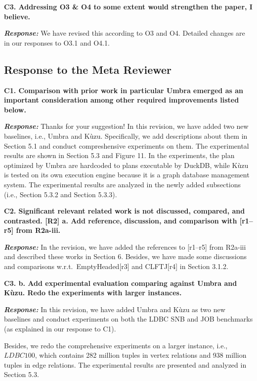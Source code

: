 \textbf{
C3. Addressing O3 \& O4 to some extent would strengthen the paper, I believe.}

\textbf{\textit{Response: }}
We have revised this according to O3 and O4. Detailed changes are in our responses to O3.1 and O4.1.



\subsection{Response to the Meta Reviewer}

\textbf{
C1. Comparison with prior work in particular Umbra emerged as an important consideration among other required improvements listed below.}

\textbf{\textit{Response: }}
Thanks for your suggestion!
In this revision, we have added two new baselines, i.e., Umbra and K\`uzu.
Specifically, we add descriptions about them in Section 5.1 and conduct compreshensive experiments on them.
The experimental results are shown in Section 5.3 and Figure 11.
In the experiments, the plan optimized by Umbra are hardcoded to plans executable by DuckDB, while K\`uzu is tested on its own execution engine because it is a graph database management system.
The experimental results are analyzed in the newly added subsections (i.e., Section 5.3.2 and Section 5.3.3).



\textbf{
C2. Significant relevant related work is not discussed, compared, and contrasted. [R2]
a. Add reference, discussion, and comparison with [r1–r5] from R2a-iii.
}

\textbf{\textit{Response: }}
In the revision, we have added the references to [r1--r5] from R2a-iii and described these works in Section 6.
Besides, we have made some discussions and comparisons w.r.t.~EmptyHeaded[r3] and CLFTJ[r4] in Section 3.1.2.


\textbf{C3. b. Add experimental evaluation comparing against Umbra and Kùzu. Redo the experiments with larger instances.}

\textbf{\textit{Response: }}
In this revision, we have added Umbra and K\`uzu as two new baselines and conduct experiments on both the LDBC SNB and JOB benchmarks (as explained in our response to C1).


Besides, we redo the comprehensive experiments on a larger instance, i.e., $LDBC100$, which contains 282 million tuples in vertex relations and 938 million tuples in edge relations.
The experimental results are presented and analyzed in Section 5.3.


